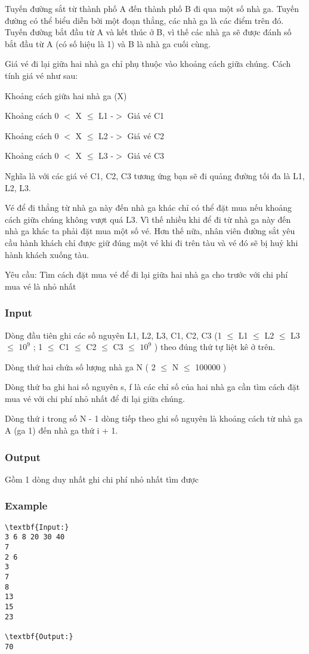



   Tuyến đường sắt từ thành phố A đến thành phố B đi qua một số nhà ga. Tuyến đường có thể biểu diễn bởi một đoạn thẳng, các nhà ga là các điểm trên đó. Tuyến đường bắt đầu từ A và kết thúc ở B, vì thế các nhà ga sẽ được đánh số bắt đầu từ A (có số hiệu là 1) và B là nhà ga cuối cùng.  

   Giá vé đi lại giữa hai nhà ga chỉ phụ thuộc vào khoảng cách giữa chúng. Cách tính giá vé như sau:  

   Khoảng cách giữa hai nhà ga (X)  

   Khoảng cách 0 $<$ X  $\le$  L1      -$>$ Giá vé              C1  

   Khoảng cách 0 $<$ X  $\le$  L2     -$>$ Giá vé              C2  

   Khoảng cách 0 $<$ X  $\le$  L3     -$>$ Giá vé              C3  

   Nghĩa là với các giá vé C1, C2, C3 tương ứng bạn sẽ đi quảng đường tối đa là L1, L2, L3.  

   Vé để đi thẳng từ nhà ga này đến nhà ga khác chỉ có thể đặt mua nếu khoảng cách giữa chúng không vượt quá L3. Vì thế nhiều khi để đi từ nhà ga này đến nhà ga khác ta phải đặt mua một số vé. Hơn thế nữa, nhân viên đường sắt yêu cầu hành khách chỉ được giữ đúng một vé khi đi trên tàu và vé đó sẽ bị huỷ khi hành khách xuống tàu.  

   Yêu cầu: Tìm cách đặt mua vé để đi lại giữa hai nhà ga cho trước với chi phí mua vé là nhỏ nhất  

\subsubsection{   Input  }

   Dòng đầu tiên ghi các số nguyên L1, L2, L3, C1, C2, C3 (1  $\le$  L1  $\le$  L2  $\le$  L3  $\le$  $10^{9}$   ;  1  $\le$  C1  $\le$  C2  $\le$  C3  $\le$  $10^{9}$   ) theo đúng thứ tự liệt kê ở trên.  

   Dòng thứ hai chứa số lượng nhà ga N ( 2  $\le$  N  $\le$  100000 )  

   Dòng thứ ba ghi hai số nguyên s, f là các chỉ số của hai nhà ga cần tìm cách đặt mua vé với chi phí nhỏ nhất để đi lại giữa chúng.  

   Dòng thứ i trong số N - 1 dòng tiếp theo ghi số nguyên là khoảng cách từ nhà ga A (ga 1) đến nhà ga thứ i + 1.  

\subsubsection{   Output  }

   Gồm 1 dòng duy nhất ghi chi phí nhỏ nhất tìm được  

\subsubsection{   Example  }
\begin{verbatim}
\textbf{Input:}
3 6 8 20 30 40
7
2 6
3
7
8
13
15
23

\textbf{Output:}
70
\end{verbatim}
